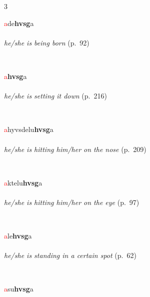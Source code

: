 \documentclass[oneside,openany]{book}%
\begin{document}
\noindent\begin{multicols}{3}%
\begin{minipage}[t]{\linewidth}
\raggedright\noindent \textcolor{Red}{a}de\textbf{hvsg}a\\
\\
\noindent \textit{he/she is being born} (p.~92)
\end{minipage}\\[1em]%
\begin{minipage}[t]{\linewidth}
\raggedright\noindent \textcolor{Red}{a}\textbf{hvsg}a\\
\noindent {\small \textsf{\textcolor{Red}{Set A}{-}\textbf{}{-}[hvsg-hn]}}\\
\noindent \textit{he/she is setting it down} (p.~216)
\end{minipage}\\[1em]%
\begin{minipage}[t]{\linewidth}
\raggedright\noindent \textcolor{Red}{a}hyvsdelu\textbf{hvsg}a\\
\\
\noindent \textit{he/she is hitting him/her on the nose} (p.~209)
\end{minipage}\\[1em]%
\begin{minipage}[t]{\linewidth}
\raggedright\noindent \textcolor{Red}{a}ktelu\textbf{hvsg}a\\
\\
\noindent \textit{he/she is hitting him/her on the eye} (p.~97)
\end{minipage}\\[1em]%
\begin{minipage}[t]{\linewidth}
\raggedright\noindent \textcolor{Red}{a}le\textbf{hvsg}a\\
\\
\noindent \textit{he/she is standing in a certain spot} (p.~62)
\end{minipage}\\[1em]%
\begin{minipage}[t]{\linewidth}
\raggedright\noindent \textcolor{Red}{a}su\textbf{hvsg}a\\
\\

\end{minipage}
\end{multicols}
\end{document}
